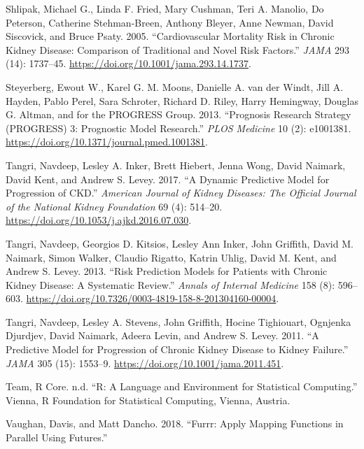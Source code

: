 \documentclass[
]{article}
\newlength{\cslhangindent}
\newenvironment{cslreferences}%
  {\setlength{\parindent}{0pt}%
  \everypar{\setlength{\hangindent}{\cslhangindent}}\ignorespaces}%
  {\par}
\begin{document}
\begin{cslreferences}
\leavevmode\hypertarget{ref-shlipak_cardiovascular_2005}{}%
Shlipak, Michael G., Linda F. Fried, Mary Cushman, Teri A. Manolio, Do Peterson, Catherine Stehman-Breen, Anthony Bleyer, Anne Newman, David Siscovick, and Bruce Psaty. 2005. ``Cardiovascular Mortality Risk in Chronic Kidney Disease: Comparison of Traditional and Novel Risk Factors.'' \emph{JAMA} 293 (14): 1737--45. \url{https://doi.org/10.1001/jama.293.14.1737}.

\leavevmode\hypertarget{ref-steyerberg_prognosis_2013}{}%
Steyerberg, Ewout W., Karel G. M. Moons, Danielle A. van der Windt, Jill A. Hayden, Pablo Perel, Sara Schroter, Richard D. Riley, Harry Hemingway, Douglas G. Altman, and for the PROGRESS Group. 2013. ``Prognosis Research Strategy (PROGRESS) 3: Prognostic Model Research.'' \emph{PLOS Medicine} 10 (2): e1001381. \url{https://doi.org/10.1371/journal.pmed.1001381}.

\leavevmode\hypertarget{ref-tangri_dynamic_2017}{}%
Tangri, Navdeep, Lesley A. Inker, Brett Hiebert, Jenna Wong, David Naimark, David Kent, and Andrew S. Levey. 2017. ``A Dynamic Predictive Model for Progression of CKD.'' \emph{American Journal of Kidney Diseases: The Official Journal of the National Kidney Foundation} 69 (4): 514--20. \url{https://doi.org/10.1053/j.ajkd.2016.07.030}.

\leavevmode\hypertarget{ref-tangri_risk_2013}{}%
Tangri, Navdeep, Georgios D. Kitsios, Lesley Ann Inker, John Griffith, David M. Naimark, Simon Walker, Claudio Rigatto, Katrin Uhlig, David M. Kent, and Andrew S. Levey. 2013. ``Risk Prediction Models for Patients with Chronic Kidney Disease: A Systematic Review.'' \emph{Annals of Internal Medicine} 158 (8): 596--603. \url{https://doi.org/10.7326/0003-4819-158-8-201304160-00004}.

\leavevmode\hypertarget{ref-tangri_predictive_2011}{}%
Tangri, Navdeep, Lesley A. Stevens, John Griffith, Hocine Tighiouart, Ognjenka Djurdjev, David Naimark, Adeera Levin, and Andrew S. Levey. 2011. ``A Predictive Model for Progression of Chronic Kidney Disease to Kidney Failure.'' \emph{JAMA} 305 (15): 1553--9. \url{https://doi.org/10.1001/jama.2011.451}.

\leavevmode\hypertarget{ref-r_core_team_r_nodate}{}%
Team, R Core. n.d. ``R: A Language and Environment for Statistical Computing.'' Vienna, R Foundation for Statistical Computing, Vienna, Austria.

\leavevmode\hypertarget{ref-vaughan_furrr_2018}{}%
Vaughan, Davis, and Matt Dancho. 2018. ``Furrr: Apply Mapping Functions in Parallel Using Futures.''


\end{cslreferences}
\end{document}
